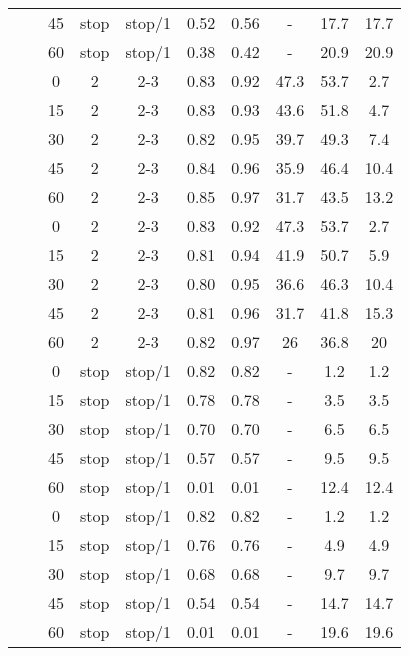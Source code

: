 \begin{longtable}[t]{cccccccccc}
&  & 45 & stop & stop/1 & 0.52 & 0.56 & - & 17.7 & 17.7\\
\nopagebreak
\multirow{-10}{*}{\centering\arraybackslash 11} & \multirow{-5}{*}{\centering\arraybackslash 0.33} & 60 & stop & stop/1 & 0.38 & 0.42 & - & 20.9 & 20.9\\
\cmidrule{1-10}\pagebreak[0]
&  & 0 & 2 & 2-3 & 0.83 & 0.92 & 47.3 & 53.7 & 2.7\\
\nopagebreak
&  & 15 & 2 & 2-3 & 0.83 & 0.93 & 43.6 & 51.8 & 4.7\\
\nopagebreak
&  & 30 & 2 & 2-3 & 0.82 & 0.95 & 39.7 & 49.3 & 7.4\\
\nopagebreak
&  & 45 & 2 & 2-3 & 0.84 & 0.96 & 35.9 & 46.4 & 10.4\\
\nopagebreak
& \multirow{-5}{*}{\centering\arraybackslash 0.2} & 60 & 2 & 2-3 & 0.85 & 0.97 & 31.7 & 43.5 & 13.2\\
\nopagebreak
&  & 0 & 2 & 2-3 & 0.83 & 0.92 & 47.3 & 53.7 & 2.7\\
\nopagebreak
&  & 15 & 2 & 2-3 & 0.81 & 0.94 & 41.9 & 50.7 & 5.9\\
\nopagebreak
&  & 30 & 2 & 2-3 & 0.80 & 0.95 & 36.6 & 46.3 & 10.4\\
\nopagebreak
&  & 45 & 2 & 2-3 & 0.81 & 0.96 & 31.7 & 41.8 & 15.3\\
\nopagebreak
\multirow{-10}{*}{\centering\arraybackslash 12} & \multirow{-5}{*}{\centering\arraybackslash 0.33} & 60 & 2 & 2-3 & 0.82 & 0.97 & 26 & 36.8 & 20\\
\cmidrule{1-10}\pagebreak[0]
&  & 0 & stop & stop/1 & 0.82 & 0.82 & - & 1.2 & 1.2\\
\nopagebreak
&  & 15 & stop & stop/1 & 0.78 & 0.78 & - & 3.5 & 3.5\\
\nopagebreak
&  & 30 & stop & stop/1 & 0.70 & 0.70 & - & 6.5 & 6.5\\
\nopagebreak
&  & 45 & stop & stop/1 & 0.57 & 0.57 & - & 9.5 & 9.5\\
\nopagebreak
& \multirow{-5}{*}{\centering\arraybackslash 0.2} & 60 & stop & stop/1 & 0.01 & 0.01 & - & 12.4 & 12.4\\
\nopagebreak
&  & 0 & stop & stop/1 & 0.82 & 0.82 & - & 1.2 & 1.2\\
\nopagebreak
&  & 15 & stop & stop/1 & 0.76 & 0.76 & - & 4.9 & 4.9\\
\nopagebreak
&  & 30 & stop & stop/1 & 0.68 & 0.68 & - & 9.7 & 9.7\\
\nopagebreak
&  & 45 & stop & stop/1 & 0.54 & 0.54 & - & 14.7 & 14.7\\
\nopagebreak
\multirow{-10}{*}{\centering\arraybackslash 13} & \multirow{-5}{*}{\centering\arraybackslash 0.33} & 60 & stop & stop/1 & 0.01 & 0.01 & - & 19.6 & 19.6\\

\end{longtable}
